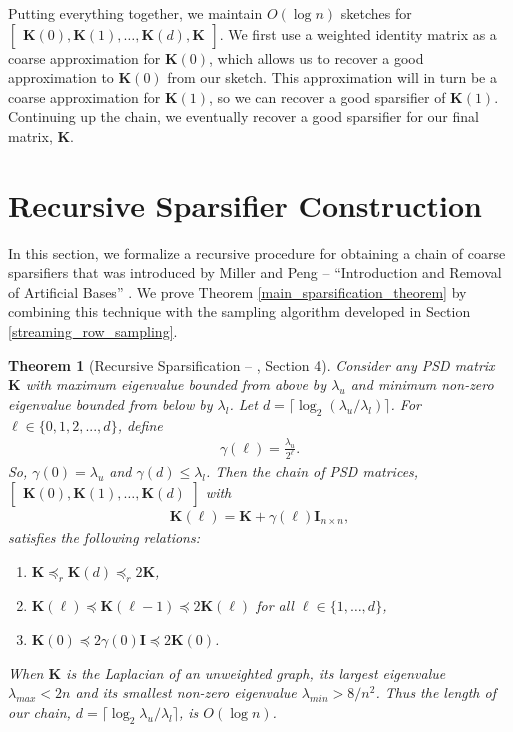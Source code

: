 \documentclass[11pt]{article}
\newcommand{\bv}[1]{\mathbf{#1}}
\newtheorem{theorem}{Theorem}
\begin{document}
Putting everything together, we maintain $O(\log n)$ sketches for $\begin{bmatrix}\bv{K}(0), \bv{K}(1), \ldots, \bv{K}(d), \bv{K}\end{bmatrix}$. We first use a weighted identity matrix as a coarse approximation for $\bv{K}(0)$, which allows us to recover a good approximation to $\bv{K}(0)$ from our sketch. This approximation will in turn be a coarse approximation for $\bv{K}(1)$, so we can recover a good sparsifier of $\bv{K}(1)$. Continuing up the chain, we eventually recover a good sparsifier for our final matrix, $\bv{K}$. 











\section{Recursive Sparsifier Construction}\label{recursive_algorithm}
In this section, we formalize a recursive procedure for obtaining a chain of coarse sparsifiers that was introduced by Miller and Peng  -- ``Introduction and Removal of Artificial Bases'' \cite{pengV1}. We prove Theorem \ref{main_sparsification_theorem} by combining this technique with the sampling algorithm developed in Section \ref{streaming_row_sampling}.



\begin{theorem}[Recursive Sparsification -- \cite{pengV1}, Section 4]
\label{miller_peng_chain}
Consider any PSD matrix $\bv{K}$ with maximum eigenvalue bounded from above by $\lambda_{u}$ and minimum non-zero eigenvalue bounded from below by $\lambda_{l}$. Let $d = \lceil \log_2 (\lambda_{u}/\lambda_{l})\rceil$.  For $\ell \in \{0,1, 2, ... , d\}$, define
\begin{align*}
\gamma(\ell) = \frac{\lambda_{u}}{2^\ell}.
\end{align*}
So, $\gamma(0) = \lambda_u$ and $\gamma(d) \leq \lambda_{l}$. Then the chain of PSD matrices, $\begin{bmatrix}\bv{K}(0), \bv{K}(1), \ldots, \bv{K}(d)\end{bmatrix}$ with
\begin{align*}
\bv{K}(\ell) = \bv{K} + \gamma(\ell)\bv{I}_{n\times n},
\end{align*}
satisfies the following relations:
\begin{enumerate}
  \item $\bv{K} \preceq_r \bv{K}(d) \preceq_r 2\bv{K}$,
  \item $\bv{K}(\ell) \preceq \bv{K}(\ell-1) \preceq 2\bv{K}(\ell)$ for all $\ell \in \{1,\ldots, d\}$,
  \item $\bv{K}(0) \preceq 2\gamma(0)\bv{I} \preceq 2\bv{K}(0)$.
\end{enumerate}
When $\bv{K}$ is the Laplacian of an unweighted graph, its largest eigenvalue $\lambda_{max} < 2n$ and its smallest non-zero eigenvalue $\lambda_{min} > 8/n^2$. Thus the length of our chain, $d = \lceil \log_2 \lambda_{u}/\lambda_{l}\rceil$, is $O(\log n)$.
\end{theorem}
\end{document}
